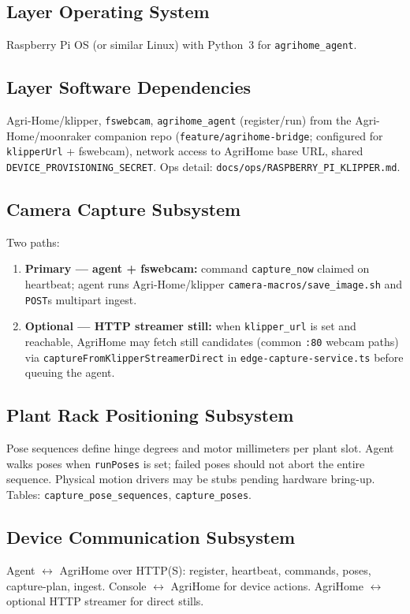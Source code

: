 \documentclass[11pt,letterpaper]{article}
\begin{document}
\subsection{Layer Operating System}
Raspberry Pi OS (or similar Linux) with Python~3 for \texttt{agrihome\_agent}.

\subsection{Layer Software Dependencies}
Agri-Home/klipper, \texttt{fswebcam}, \texttt{agrihome\_agent} (register/run) from the
Agri-Home/moonraker companion repo (\texttt{feature/agrihome-bridge}; configured for
\texttt{klipperUrl} + fswebcam), network access to AgriHome base URL, shared
\texttt{DEVICE\_PROVISIONING\_SECRET}. Ops detail:
\texttt{docs/ops/RASPBERRY\_PI\_KLIPPER.md}.

\subsection{Camera Capture Subsystem}
Two paths:
\begin{enumerate}
  \item \textbf{Primary --- agent + fswebcam:} command \texttt{capture\_now} claimed on
        heartbeat; agent runs Agri-Home/klipper \texttt{camera-macros/save\_image.sh} and
        \texttt{POST}s multipart ingest.
  \item \textbf{Optional --- HTTP streamer still:} when \texttt{klipper\_url} is set and
        reachable, AgriHome may fetch still candidates (common \texttt{:80} webcam paths)
        via \texttt{captureFromKlipperStreamerDirect} in \texttt{edge-capture-service.ts}
        before queuing the agent.
\end{enumerate}

\subsection{Plant Rack Positioning Subsystem}
Pose sequences define hinge degrees and motor millimeters per plant slot. Agent walks poses when
\texttt{runPoses} is set; failed poses should not abort the entire sequence. Physical motion
drivers may be stubs pending hardware bring-up. Tables:
\texttt{capture\_pose\_sequences}, \texttt{capture\_poses}.

\subsection{Device Communication Subsystem}
Agent $\leftrightarrow$ AgriHome over HTTP(S): register, heartbeat, commands, poses,
capture-plan, ingest. Console $\leftrightarrow$ AgriHome for device actions. AgriHome
$\leftrightarrow$ optional HTTP streamer for direct stills.
\end{document}
